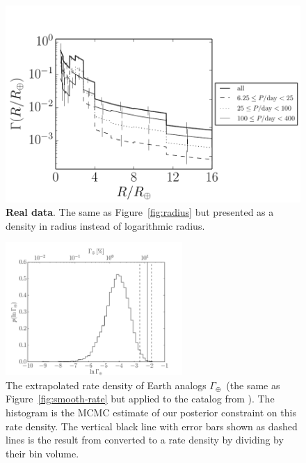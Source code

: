 \documentclass[12pt,preprint]{aastex}
\newcommand{\figref}[1]{\ref{fig:#1}}
\newcommand{\Fig}[1]{Figure~\figref{#1}}
\newcommand{\fig}[1]{\Fig{#1}}
\newcommand{\figlabel}[1]{\label{fig:#1}}
\newcommand{\rate}{\ensuremath{\Gamma}}
\newcommand{\gammaearth}{{\ensuremath{\rate_\oplus}}}
\begin{document}
\begin{figure}[p]
\begin{center}
\includegraphics{figures/results/linear-radius.pdf}
\end{center}
\caption{%
{\bf Real data}.
The same as \fig{radius} but presented as a density in radius instead of
logarithmic radius.
\figlabel{linear-radius}}
\end{figure}

\begin{figure}[p]
\begin{center}
\includegraphics[width=0.6\textwidth]{figures/results/rate.pdf}
\end{center}
\caption{%
The extrapolated rate density of Earth analogs \gammaearth\ (the same as
\fig{smooth-rate} but applied to the catalog from \citealt{petigura}).
The histogram is the MCMC estimate of our posterior constraint on this rate
density.
The vertical black line with error bars shown as dashed lines is the result
from \citet{petigura} converted to a rate density by dividing by their bin
volume.
\figlabel{real-rate}}
\end{figure}
\end{document}
